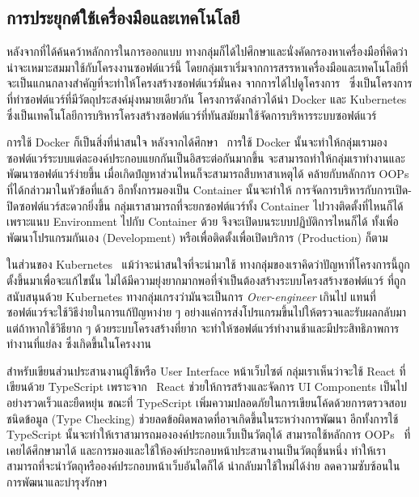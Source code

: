 \documentclass[12pt,one side,openright,a4paper]{cpe-thesis-th}
\newcommand{\thaijustify}[1]{%
  \par\hspace{30pt}\justifying
  #1
}
\begin{document}
\subsection{การประยุกต์ใช้เครื่องมือและเทคโนโลยี}
\thaijustify{
  หลังจากที่ได้ค้นคว้าหลักการในการออกแบบ ทางกลุ่มก็ได้ไปศึกษาและนั่งคัดกรองหาเครื่องมือที่คิดว่าน่าจะเหมาะสมมาใช้กับโครงงานซอฟต์แวร์นี้ โดยกลุ่มเราเริ่มจากการสรรหาเครื่องมือและเทคโนโลยีที่จะเป็นแกนกลางสำคัญที่จะทำให้โครงสร้างซอฟต์แวร์มั่นคง จากการได้ไปดูโครงการ~\cite{nattawat20pgs} ซึ่งเป็นโครงการที่ทำซอฟต์แวร์ที่มีวัตถุประสงค์มุ่งหมายเดียวกัน โครงการดังกล่าวได้นำ Docker และ Kubernetes ซึ่งเป็นเทคโนโลยีการบริหารโครงสร้างซอฟต์แวร์ที่ทันสมัยมาใช้จัดการบริหารระบบซอฟต์แวร์
}
\thaijustify{
  การใช้ Docker ก็เป็นสิ่งที่น่าสนใจ หลังจากได้ศึกษา~\cite{docker, yıldız23docker, dockerdummies, chesterwood21microservice, dockerdoc} การใช้ Docker นั้นจะทำให้กลุ่มเรามองซอฟต์แวร์ระบบแต่ละองค์ประกอบแยกกันเป็นอิสระต่อกันมากขึ้น จะสามารถทำให้กลุ่มเราทำงานและพัฒนาซอฟต์แวร์ง่ายขึ้น เมื่อเกิดปํญหาส่วนไหนก็จะสามารถสืบหาสาเหตุได้ คล้ายกับหลักการ OOPs ที่ได้กล่าวมาในหัวข้อที่แล้ว อีกทั้งการมองเป็น Container นั้นจะทำให้ การจัดการบริหารกับการเปิด-ปิดซอฟต์แวร์สะดวกยิ่งขึ้น กลุ่มเราสามารถที่จะยกซอฟต์แวร์ทั้ง Container ไปวางติดตั้งที่ไหนก็ได้ เพราะแนบ Environment ไปกับ Container ด้วย จึงจะเปิดบนระบบปฏิบัติการไหนก็ได้ ทั้งเพื่อพัฒนาโปรแกรมกันเอง (Development) หรือเพื่อติดตั้งเพื่อเปิดบริการ (Production) ก็ตาม
}
\thaijustify{
  ในส่วนของ Kubernetes~\cite{kubernetes, kubemed20} แม้ว่าจะน่าสนใจที่จะนำมาใช้ ทางกลุ่มของเราคิดว่าปัญหาที่โครงการนี้ถูกตั้งขึ้นมาเพื่อจะแก้ไขนั้น ไม่ได้มีความยุ่งยากมากพอที่จำเป็นต้องสร้างระบบโครงสร้างซอฟต์แวร์ ที่ถูกสนับสนุนด้วย Kubernetes ทางกลุ่มเกรงว่ามันจะเป็นการ \textit{Over-engineer} เกินไป แทนที่ซอฟต์แวร์จะใช้วิธีง่ายในการแก้ปัญหาง่าย ๆ อย่างแค่การส่งโปรแกรมขึ้นไปให้ตรวจและรับผลกลับมา แต่ถ้าหากใช้วิธียาก ๆ ด้วยระบบโครงสร้างที่ยาก จะทำให้ซอฟต์แวร์ทำงานช้าและมีประสิทธิภาพการทำงานที่แย่ลง ซึ่งเกิดขึ้นในโครงงาน~\cite{nattawat20pgs}
}
\thaijustify{
  สำหรับเขียนส่วนประสานงานผู้ใช้หรือ User Interface หน้าเว็บไซต์ กลุ่มเราเห็นว่าจะใช้ React ที่เขียนด้วย TypeScript เพราะจาก~\cite{flanagan20js, crockford08js, hejlsbergts, microsoftts, cherny19ts} React ช่วยให้การสร้างและจัดการ UI Components เป็นไปอย่างรวดเร็วและยืดหยุ่น ขณะที่ TypeScript เพิ่มความปลอดภัยในการเขียนโค้ดด้วยการตรวจสอบชนิดข้อมูล (Type Checking) ช่วยลดข้อผิดพลาดที่อาจเกิดขึ้นในระหว่างการพัฒนา อีกทั้งการใช้ TypeScript นั้นจะทำให้เราสามารถมององค์ประกอบเว็บเป็นวัตถุได้ สามารถใช้หลักการ OOPs~\cite{apollo22oop, moses22obj, johnson88classobj, sakpal18inheritance, stroustrup94inheritance, javapolymorph, nzeruekenneth23polymorph, ntu20polymorph, saladpukabstract, liskov87abstaction, raut22encapsule, nishad22encapsulation} ที่เคยได้ศึกษามาได้ และการมองและใช้ให้องค์ประกอบหน้าประสานงานเป็นวัตถุชิ้นหนึ่ง ทำให้เราสามารถที่จะนำวัตถุหรือองค์ประกอบหน้าเว็บอันใดก็ได้ นำกลับมาใช้ใหม่ได้ง่าย ลดความซับซ้อนในการพัฒนาและบำรุงรักษา
}
\end{document}

